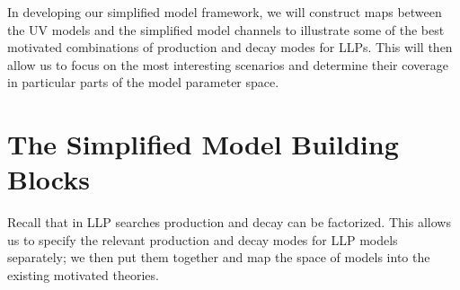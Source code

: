 %
In developing our simplified model framework, we will construct maps between the UV models and the simplified model channels to illustrate some of the best motivated combinations of production and decay modes for LLPs. This will then allow us to focus on the most interesting scenarios and determine their coverage in particular parts of the model parameter space.

\section{The Simplified Model Building Blocks}

Recall that in LLP searches production and decay can be factorized. This allows us to specify the relevant production and decay modes for LLP models separately; we then put them together and map the space of models into the existing motivated theories.

